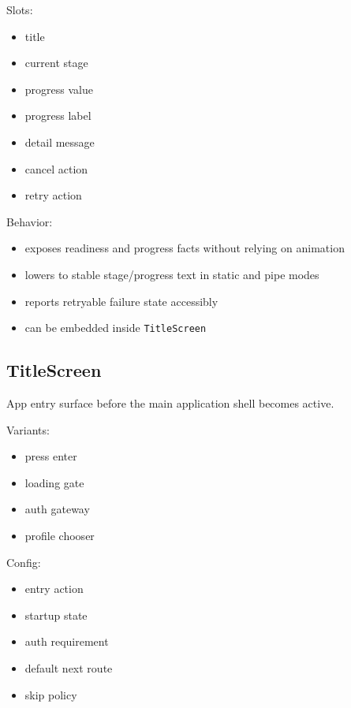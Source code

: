 Slots:

\begin{itemize}
\tightlist
\item
  title
\item
  current stage
\item
  progress value
\item
  progress label
\item
  detail message
\item
  cancel action
\item
  retry action
\end{itemize}

Behavior:

\begin{itemize}
\tightlist
\item
  exposes readiness and progress facts without relying on animation
\item
  lowers to stable stage/progress text in static and pipe modes
\item
  reports retryable failure state accessibly
\item
  can be embedded inside \texttt{T\allowbreak{}i\allowbreak{}t\allowbreak{}l\allowbreak{}e\allowbreak{}S\allowbreak{}c\allowbreak{}r\allowbreak{}e\allowbreak{}e\allowbreak{}n}
\end{itemize}

\subsection{TitleScreen}\label{record-128-titlescreen}

App entry surface before the main application shell becomes active.

Variants:

\begin{itemize}
\tightlist
\item
  press enter
\item
  loading gate
\item
  auth gateway
\item
  profile chooser
\end{itemize}

Config:

\begin{itemize}
\tightlist
\item
  entry action
\item
  startup state
\item
  auth requirement
\item
  default next route
\item
  skip policy
\end{itemize}

